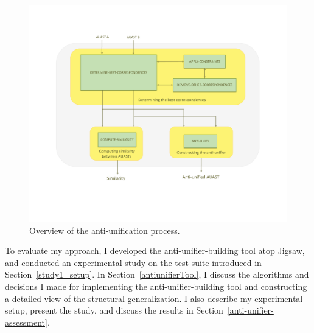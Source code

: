 


\begin{figure} [H]
  \centering\includegraphics [width = \textwidth]{Drawing4/auOverview.pdf}
  \caption{Overview of the anti-unification process.}
  \label{fig:meth_overview}
\end{figure}


To evaluate my approach, I developed the anti-unifier-building tool atop Jigsaw, and conducted an experimental study on the test suite introduced in Section~\ref{study1_setup}. In Section~\ref{antiunifierTool}, I discuss the algorithms and decisions I made for implementing the anti-unifier-building tool and constructing a detailed view of the structural generalization. I also describe my experimental setup, present the study, and discuss the results in Section~\ref{anti-unifier-assessment}.




